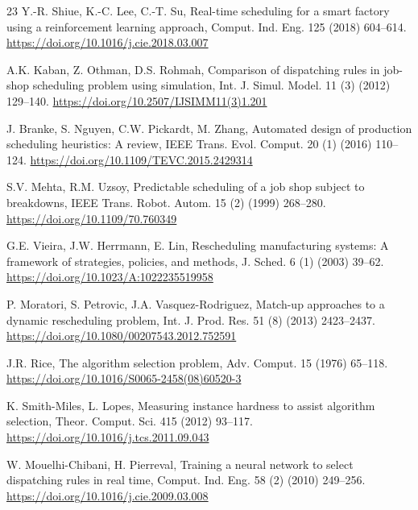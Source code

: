 \documentclass[3p,times]{elsarticle}
\begin{document}
\begin{thebibliography}{23}
Y.-R. Shiue, K.-C. Lee, C.-T. Su,
Real-time scheduling for a smart factory using a reinforcement
  learning approach,
Comput. Ind. Eng. 125 (2018) 604--614.
\newline\url{https://doi.org/10.1016/j.cie.2018.03.007}

A.K. Kaban, Z. Othman, D.S. Rohmah,
Comparison of dispatching rules in job-shop scheduling problem
  using simulation,
Int. J. Simul. Model. 11 (3) (2012) 129--140.
\newline\url{https://doi.org/10.2507/IJSIMM11(3)1.201}

J. Branke, S. Nguyen, C.W. Pickardt, M. Zhang,
Automated design of production scheduling heuristics: A review,
IEEE Trans. Evol. Comput. 20 (1) (2016) 110--124.
\newline\url{https://doi.org/10.1109/TEVC.2015.2429314}

S.V. Mehta, R.M. Uzsoy,
Predictable scheduling of a job shop subject to breakdowns,
IEEE Trans. Robot. Autom. 15 (2) (1999) 268--280.
\newline\url{https://doi.org/10.1109/70.760349}

G.E. Vieira, J.W. Herrmann, E. Lin,
Rescheduling manufacturing systems: A framework of strategies,
  policies, and methods,
J. Sched. 6 (1) (2003) 39--62.
\newline\url{https://doi.org/10.1023/A:1022235519958}

P. Moratori, S. Petrovic, J.A. Vasquez-Rodriguez,
Match-up approaches to a dynamic rescheduling problem,
Int. J. Prod. Res. 51 (8) (2013) 2423--2437.
\newline\url{https://doi.org/10.1080/00207543.2012.752591}

J.R. Rice,
The algorithm selection problem,
Adv. Comput. 15 (1976) 65--118.
\newline\url{https://doi.org/10.1016/S0065-2458(08)60520-3}

K. Smith-Miles, L. Lopes,
Measuring instance hardness to assist algorithm selection,
Theor. Comput. Sci. 415 (2012) 93--117.
\newline\url{https://doi.org/10.1016/j.tcs.2011.09.043}

W. Mouelhi-Chibani, H. Pierreval,
Training a neural network to select dispatching rules in real
  time,
Comput. Ind. Eng. 58 (2) (2010) 249--256.
\newline\url{https://doi.org/10.1016/j.cie.2009.03.008}


\end{thebibliography}
\end{document}
